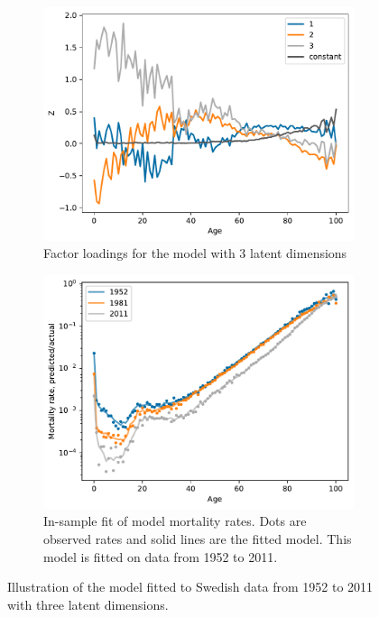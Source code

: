 \documentclass[preprint,12pt]{elsarticle}
\begin{document}
\begin{figure}
\begin{subfigure}[b]{0.45\textwidth}
    \end{subfigure}
    \hfill
    \begin{subfigure}[b]{0.45\textwidth}
        \centering
        \includegraphics[width=\textwidth]{figs/sweden_1952_2011_Male_100_1_3loadings.pdf}
        \caption{Factor loadings for the model with 3 latent dimensions}
    \end{subfigure}
    \hfill
    \begin{subfigure}[b]{0.45\textwidth}
        \centering
        \includegraphics[width=\textwidth]{figs/sweden_1952_2011_Male_100_1_3rateVsAge.pdf}
        \caption{In-sample fit of model mortality rates. Dots are observed rates and solid lines are the fitted model. This model is fitted on data from 1952 to 2011.}
        \label{fig:mortality_rates_in_sample_fit_sweden}
    \end{subfigure}
 
    \caption{Illustration of the model fitted to Swedish data from 1952 to 2011 with three latent dimensions.}
    \label{fig:model_illustration_sweden}
\end{figure}
\end{document}
